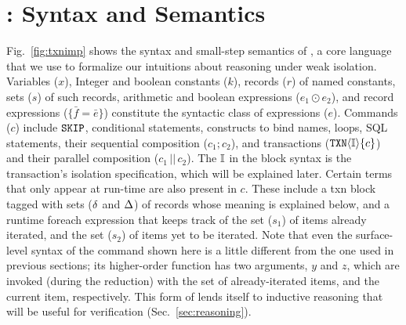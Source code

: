 \section{\txnimp: Syntax and Semantics}
\label{sec:opsem}

\label{sec:syntax}



Fig.~\ref{fig:txnimp} shows the syntax and small-step semantics of
\txnimp, a core language that we use to formalize our intuitions about
reasoning under weak isolation. Variables ($x$), Integer and boolean
constants ($k$), records ($r$) of named constants, sets ($s$) of such
records, arithmetic and boolean expressions ($e_1 \odot e_2$), and
record expressions ($\{\bar{f}=\bar{e}\}$) constitute the syntactic
class of expressions ($e$). Commands ($c$) include $\cskip$,
conditional statements,  constructs to bind names, 
loops, SQL statements, their sequential composition ($c_1;c_2$), and
transactions ($\ctxn{i}{\I}{c}$) and their parallel composition
($c_1\,||\,c_2$). The $\I$ in the  block syntax is the
transaction's isolation specification, which will be explained later.
Certain terms that only appear at run-time are also present in $c$.
These include a {\sf txn} block tagged with sets ($\stl$ and $\stg$) of
records whose meaning is explained below, and a runtime {\sf foreach}
expression that keeps track of the set ($s_1$) of items already
iterated, and the set ($s_2$) of items yet to be iterated. Note that
even the surface-level syntax of the  command shown here is
a little different from the one used in previous sections; its
higher-order function has two arguments, $y$ and $z$, which are
invoked (during the reduction) with the set of already-iterated items,
and the current item, respectively. This form of  lends
itself to inductive reasoning that will be useful for verification
(Sec.~\ref{sec:reasoning}).


